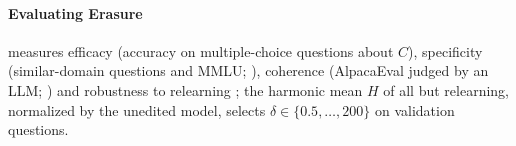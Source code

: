 \paragraph{Evaluating Erasure}
\ember{} measures efficacy (accuracy on multiple-choice questions about $C$), specificity (similar-domain questions and MMLU; \citealp{hendrycks2021mmlu}), coherence (AlpacaEval judged by an LLM; \citealp{taori2023alpaca}) and robustness to relearning \citep{deeb2024unlearning}; the harmonic mean $H$ of all but relearning, normalized by the unedited model, selects $\delta \in \{0.5, \dots, 200\}$ on validation questions.
